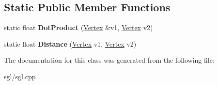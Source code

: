 \subsection*{Static Public Member Functions}
\begin{DoxyCompactItemize}
\item 
\mbox{\label{class_vertex_a90c0b93ebbbaf3e686416d3c0efb3915}} 
static float {\bfseries Dot\+Product} (\hyperlink{class_vertex}{Vertex} \&v1, \hyperlink{class_vertex}{Vertex} v2)
\item 
\mbox{\label{class_vertex_acf36b7b488e2b11975bc8d861685913b}} 
static float {\bfseries Distance} (\hyperlink{class_vertex}{Vertex} v1, \hyperlink{class_vertex}{Vertex} v2)
\end{DoxyCompactItemize}


The documentation for this class was generated from the following file\+:\begin{DoxyCompactItemize}
\item 
sgl/sgl.\+cpp\end{DoxyCompactItemize}

